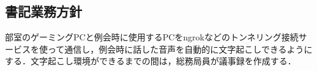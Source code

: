 \subsection*{書記業務方針}

部室のゲーミングPCと例会時に使用するPCをngrokなどのトンネリング接続サービスを使って通信し，例会時に話した音声を自動的に文字起こしできるようにする．文字起こし環境ができるまでの間は，総務局員が議事録を作成する．

